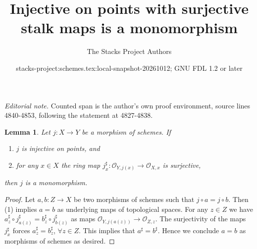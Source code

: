 \documentclass{stacks-project}
\title{Injective on points with surjective stalk maps is a monomorphism}
\author{The Stacks Project Authors}
\date{stacks-project:schemes.tex:local-snapshot-20261012; GNU FDL 1.2 or later}
\theoremstyle{plain}
\newtheorem{lemma}[subsection]{Lemma}
\theoremstyle{definition}
\theoremstyle{remark}
\numberwithin{equation}{subsection}
\begin{document}
\maketitle
\noindent\textit{Editorial note.} Counted span is the author's own proof environment, source lines 4840-4853, following the statement at 4827-4838.\par\medskip
\begin{lemma}
\label{lemma-injective-points-surjective-stalks}
Let $j : X \to Y$ be a morphism of schemes.
If
\begin{enumerate}
\item $j$ is injective on points, and
\item for any $x \in X$ the ring map
$j^\sharp_x : \mathcal{O}_{Y, j(x)} \to \mathcal{O}_{X, x}$
is surjective,
\end{enumerate}
then $j$ is a monomorphism.
\end{lemma}

\begin{proof}
Let $a, b : Z \to X$ be two morphisms of schemes such that
$j \circ a  = j \circ b$.
Then (1) implies $a = b$ as underlying
maps of topological spaces.
For any $z \in Z$ we have
$a^\sharp_z \circ j^\sharp_{a(z)} = b^\sharp_z \circ j^\sharp_{b(z)}$
as maps $\mathcal{O}_{Y, j(a(z))} \to \mathcal{O}_{Z, z}$.
The surjectivity of the maps
$j^\sharp_x$ forces $a^\sharp_z = b^\sharp_z$, $\forall z \in Z$.
This implies that $a^\sharp = b^\sharp$.
Hence we conclude $a = b$ as morphisms of schemes
as desired.
\end{proof}
\end{document}
